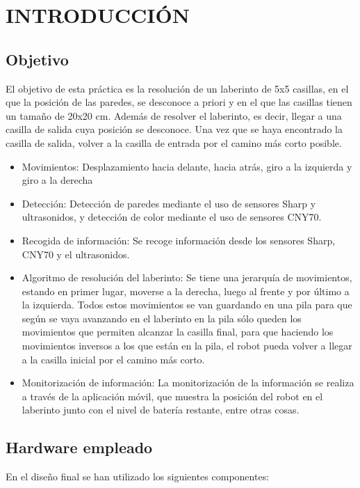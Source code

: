 
\chapter{INTRODUCCIÓN}

\section{Objetivo}
El objetivo de esta práctica es la resolución de un laberinto de 5x5 casillas, en el que la posición de las paredes, se desconoce a priori y en el que las casillas tienen un tamaño de 20x20 cm. Además de resolver el laberinto, es decir, llegar a una casilla de salida cuya posición se desconoce. Una vez que se haya encontrado la casilla de salida, volver a la casilla de entrada por el camino más corto posible.

\begin{itemize}
  \item Movimientos: Desplazamiento hacia delante, hacia atrás, giro a la izquierda y giro a la derecha
  \item Detección: Detección de paredes mediante el uso de sensores Sharp y ultrasonidos, y detección de color mediante el uso de sensores CNY70.
  \item Recogida de información: Se recoge información desde los sensores Sharp, CNY70 y el ultrasonidos.
  \item Algoritmo de resolución del laberinto: Se tiene una jerarquía de movimientos, estando en primer lugar, moverse a la derecha, luego al frente y por último a la izquierda. Todos estos movimientos se van guardando en una pila para que según se vaya avanzando en el laberinto en la pila sólo queden los movimientos que permiten alcanzar la casilla final, para que haciendo los movimientos inversos a los que están en la pila, el robot pueda volver a llegar a la casilla inicial por el camino más corto.
  \item Monitorización de información: La monitorización de la información se realiza a través de la aplicación móvil, que muestra la posición del robot en el laberinto junto con el nivel de batería restante, entre otras cosas.

\end{itemize}


\section{Hardware empleado}
En el diseño final se han utilizado los siguientes componentes:

